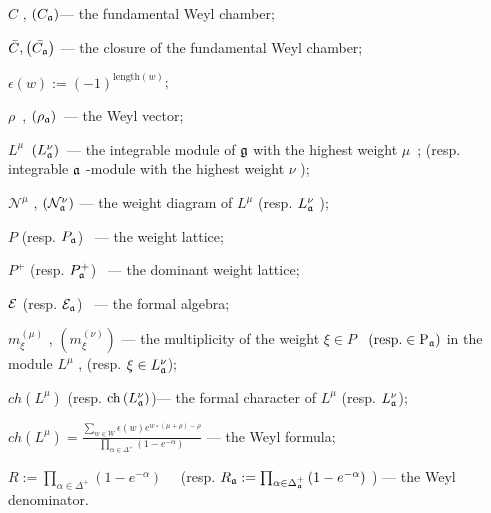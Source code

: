 \documentclass[12pt]{article}
\begin{document}
$C$ , $\left( C_{\frak{a}}\right) $--- the fundamental Weyl
chamber;

$\bar{C}, \left(\bar{C_{\frak{a}}}\right)$ --- the closure of the
fundamental Weyl chamber;

$\epsilon \left( w\right) :=\left( -1\right)
^{\mathrm{length}(w)}$;

$\rho $\ , $\left( \rho _{\frak{a}}\right) $\ --- the Weyl vector;

$L^{\mu }$\ $\left( L_{\frak{a}}^{\nu }\right) $\ --- the
integrable module of $\frak{g}$ with the highest weight $\mu $\ ;
(resp. integrable $\frak{a}$ -module with the highest weight $\nu
$ );

$\mathcal{N}^{\mu }$ , $\left( \mathcal{N}_{\frak{a}}^{\nu
}\right) $ --- the weight diagram of $L^{\mu }$ (resp.
${}L_{\frak{a}}^{\nu }$ );

$P$ (resp. $P_{\frak{a}} $) \ --- the weight lattice;

$P^{+}$ (resp. $P_{\frak{a}}^{+} $) \ --- the dominant weight
lattice;

$\cal{E}$ (resp. $\cal{E}_{\frak{a}} $) \ --- the formal algebra;

$m_{\xi }^{\left( \mu \right) }$ , $\left( m_{\xi }^{\left( \nu
\right)
}\right) $ --- the multiplicity of the weight $\xi \in P$ \ $\left( \mathrm{{%
resp. }\in P_{\frak{a}}}\right) $ in the module $L^{\mu }$ ,
(resp. $\xi \in L_{\frak{a}}^{\nu } $);

$ch\left( L^{\mu }\right) $ (resp. $\mathrm{ch}\left(
L_{\frak{a}}^{\nu }\right) $)--- the formal character of $L^{\mu
}$ (resp. $L_{\frak{a}}^{\nu } $);

$ch\left( L^{\mu }\right)
 =\frac{\sum_{w\in W}\epsilon
(w)e^{w\circ (\mu +\rho )-\rho }}
{\prod_{\alpha \in \Delta
^{+}}
\left( 1-e^{-\alpha }\right) }
$ --- the Weyl formula;

$R:=\prod_{\alpha \in \Delta ^{+}}\left( 1-e^{-\alpha }\right)
\quad
$
(resp.
$
R_{\frak{a}}:
=\prod_{\alpha \in \Delta_{\frak{a}}^{+}}
\left( 1-e^{-\alpha }\right)
$
) --- the Weyl
denominator.
\end{document}
